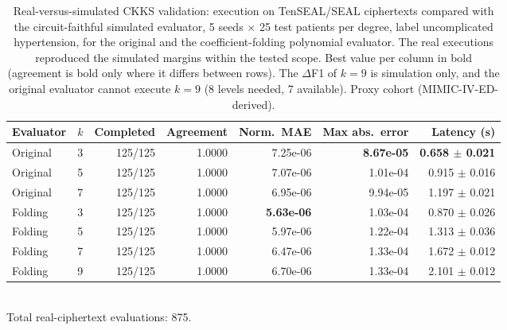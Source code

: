\begin{table}[t]
\centering
\caption{Real-versus-simulated CKKS validation: execution on TenSEAL/SEAL ciphertexts compared with the circuit-faithful simulated evaluator, 5 seeds $\times$ 25 test patients per degree, label uncomplicated hypertension, for the original and the coefficient-folding polynomial evaluator. The real executions reproduced the simulated margins within the tested scope. Best value per column in bold (agreement is bold only where it differs between rows). The $\Delta$F1 of $k=9$ is simulation only, and the original evaluator cannot execute $k=9$ (8 levels needed, 7 available). Proxy cohort (MIMIC-IV-ED-derived).}
\label{tab:t5_real_vs_simulated}
\begin{tabular}{llrrrrr}
\toprule
Evaluator & $k$ & Completed & Agreement & Norm.\ MAE & Max abs.\ error & Latency (s) \\
\midrule
Original & 3 & 125/125 & 1.0000 & 7.25e-06 & \textbf{8.67e-05} & \textbf{0.658 $\pm$ 0.021} \\
Original & 5 & 125/125 & 1.0000 & 7.07e-06 & 1.01e-04 & 0.915 $\pm$ 0.016 \\
Original & 7 & 125/125 & 1.0000 & 6.95e-06 & 9.94e-05 & 1.197 $\pm$ 0.021 \\
\midrule
Folding & 3 & 125/125 & 1.0000 & \textbf{5.63e-06} & 1.03e-04 & 0.870 $\pm$ 0.026 \\
Folding & 5 & 125/125 & 1.0000 & 5.97e-06 & 1.22e-04 & 1.313 $\pm$ 0.036 \\
Folding & 7 & 125/125 & 1.0000 & 6.47e-06 & 1.33e-04 & 1.672 $\pm$ 0.012 \\
Folding & 9 & 125/125 & 1.0000 & 6.70e-06 & 1.33e-04 & 2.101 $\pm$ 0.012 \\
\bottomrule
\end{tabular}
\\[2pt]
{\footnotesize Total real-ciphertext evaluations: 875.}
\end{table}
